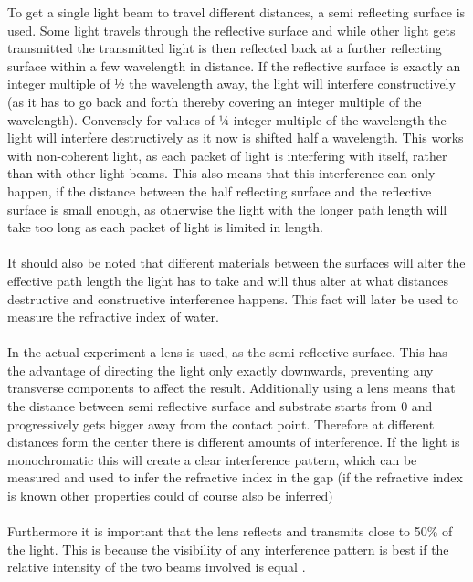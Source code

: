 \documentclass[12pt]{article}
\begin{document}
To get a single light beam to travel different distances, a semi reflecting surface
is used. Some light travels through the reflective surface and while other light gets
transmitted the transmitted light is then reflected back at a further reflecting surface
within a few wavelength in distance. If the reflective surface is exactly an integer
multiple of ½ the wavelength away, the light will interfere constructively (as it has
to go back and forth thereby covering an integer multiple of the wavelength).
Conversely for values of ¼ integer multiple of the wavelength the light will interfere
destructively as it now is shifted half a wavelength. This works with non-coherent light, as each 
packet of light is interfering with itself, rather than with other light beams. This
also means that this interference can only happen, if the distance between the half 
reflecting surface and the reflective surface is small enough, as otherwise the light 
with the longer path length will take too long as each packet of light is limited in length.\\
\\
It should also be noted that different materials between the surfaces will alter the effective 
path length the light has to take and will thus alter at what distances destructive and 
constructive interference happens. This fact will later be used to measure the refractive index of water.\\
\\
In the actual experiment a lens is used, as the semi reflective surface. 
This has the advantage of directing the light only exactly downwards, 
preventing any transverse components to affect the result. Additionally using a
lens means that the distance between semi reflective surface and substrate starts from 0 and 
progressively gets bigger away from the contact point. Therefore at different distances form 
the center there is different amounts of interference. If the light is monochromatic this
will create a clear interference pattern, which can be measured and used to infer the refractive
index in the gap (if the refractive index is known other properties could of course also be inferred)\\
\\
Furthermore it is important that the lens reflects and transmits close to  50\% of the light. 
This is because the visibility of any interference pattern is best if the relative intensity
of the two beams involved is equal \autocite{ross}.\\
\\
\end{document}
